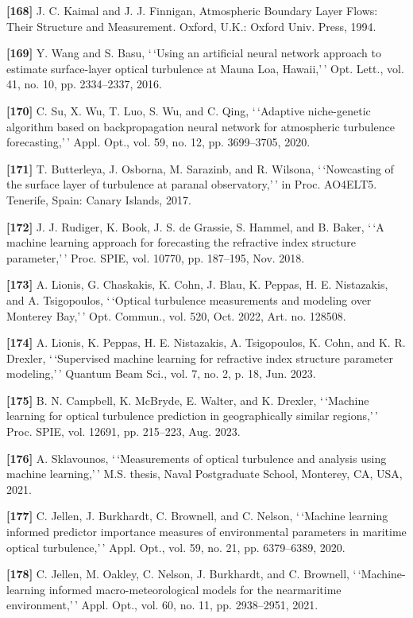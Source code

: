 \documentclass[
]{article}
\begin{document}
\textbf{{[}168{]}} J. C. Kaimal and J. J. Finnigan, Atmospheric Boundary
Layer Flows: Their Structure and Measurement. Oxford, U.K.: Oxford Univ.
Press, 1994.

\textbf{{[}169{]}} Y. Wang and S. Basu, `\,`Using an artificial neural
network approach to estimate surface-layer optical turbulence at Mauna
Loa, Hawaii,'\,' Opt. Lett., vol. 41, no. 10, pp. 2334--2337, 2016.

\textbf{{[}170{]}} C. Su, X. Wu, T. Luo, S. Wu, and C. Qing,
`\,`Adaptive niche-genetic algorithm based on backpropagation neural
network for atmospheric turbulence forecasting,'\,' Appl. Opt., vol. 59,
no. 12, pp. 3699--3705, 2020.

\textbf{{[}171{]}} T. Butterleya, J. Osborna, M. Sarazinb, and R.
Wilsona, `\,`Nowcasting of the surface layer of turbulence at paranal
observatory,'\,' in Proc. AO4ELT5. Tenerife, Spain: Canary Islands,
2017.

\textbf{{[}172{]}} J. J. Rudiger, K. Book, J. S. de Grassie, S. Hammel,
and B. Baker, `\,`A machine learning approach for forecasting the
refractive index structure parameter,'\,' Proc. SPIE, vol. 10770, pp.
187--195, Nov. 2018.

\textbf{{[}173{]}} A. Lionis, G. Chaskakis, K. Cohn, J. Blau, K. Peppas,
H. E. Nistazakis, and A. Tsigopoulos, `\,`Optical turbulence
measurements and modeling over Monterey Bay,'\,' Opt. Commun., vol. 520,
Oct. 2022, Art. no. 128508.

\textbf{{[}174{]}} A. Lionis, K. Peppas, H. E. Nistazakis, A.
Tsigopoulos, K. Cohn, and K. R. Drexler, `\,`Supervised machine learning
for refractive index structure parameter modeling,'\,' Quantum Beam
Sci., vol. 7, no. 2, p. 18, Jun. 2023.

\textbf{{[}175{]}} B. N. Campbell, K. McBryde, E. Walter, and K.
Drexler, `\,`Machine learning for optical turbulence prediction in
geographically similar regions,'\,' Proc. SPIE, vol. 12691, pp.
215--223, Aug. 2023.

\textbf{{[}176{]}} A. Sklavounos, `\,`Measurements of optical turbulence
and analysis using machine learning,'\,' M.S. thesis, Naval Postgraduate
School, Monterey, CA, USA, 2021.

\textbf{{[}177{]}} C. Jellen, J. Burkhardt, C. Brownell, and C. Nelson,
`\,`Machine learning informed predictor importance measures of
environmental parameters in maritime optical turbulence,'\,' Appl. Opt.,
vol. 59, no. 21, pp. 6379--6389, 2020.

\textbf{{[}178{]}} C. Jellen, M. Oakley, C. Nelson, J. Burkhardt, and C.
Brownell, `\,`Machine-learning informed macro-meteorological models for
the nearmaritime environment,'\,' Appl. Opt., vol. 60, no. 11, pp.
2938--2951, 2021.
\end{document}

